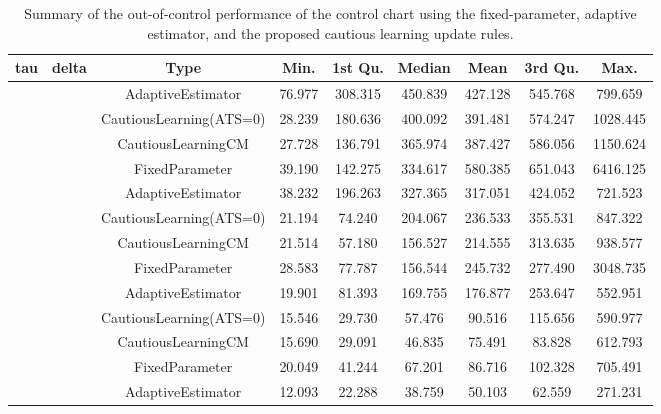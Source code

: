 \begin{table}[!h]

\caption{Summary of the out-of-control performance of the control chart using the fixed-parameter, adaptive estimator, and the proposed cautious learning update rules.}
\centering
\begin{tabular}[t]{ccccccccc}
\toprule
tau & delta & Type & Min. & 1st Qu. & Median & Mean & 3rd Qu. & Max.\\
\midrule
 &  & AdaptiveEstimator & 76.977 & 308.315 & 450.839 & 427.128 & 545.768 & 799.659\\

 &  & CautiousLearning(ATS=0) & 28.239 & 180.636 & 400.092 & 391.481 & 574.247 & 1028.445\\

 &  & CautiousLearningCM & 27.728 & 136.791 & 365.974 & 387.427 & 586.056 & 1150.624\\

 & \multirow[t]{-4}{*}{\centering\arraybackslash 0.25} & FixedParameter & 39.190 & 142.275 & 334.617 & 580.385 & 651.043 & 6416.125\\
\cmidrule{2-9}
 &  & AdaptiveEstimator & 38.232 & 196.263 & 327.365 & 317.051 & 424.052 & 721.523\\

 &  & CautiousLearning(ATS=0) & 21.194 & 74.240 & 204.067 & 236.533 & 355.531 & 847.322\\

 &  & CautiousLearningCM & 21.514 & 57.180 & 156.527 & 214.555 & 313.635 & 938.577\\

 & \multirow[t]{-4}{*}{\centering\arraybackslash 0.35} & FixedParameter & 28.583 & 77.787 & 156.544 & 245.732 & 277.490 & 3048.735\\
\cmidrule{2-9}
 &  & AdaptiveEstimator & 19.901 & 81.393 & 169.755 & 176.877 & 253.647 & 552.951\\

 &  & CautiousLearning(ATS=0) & 15.546 & 29.730 & 57.476 & 90.516 & 115.656 & 590.977\\

 &  & CautiousLearningCM & 15.690 & 29.091 & 46.835 & 75.491 & 83.828 & 612.793\\

 & \multirow[t]{-4}{*}{\centering\arraybackslash 0.50} & FixedParameter & 20.049 & 41.244 & 67.201 & 86.716 & 102.328 & 705.491\\
\cmidrule{2-9}
 &  & AdaptiveEstimator & 12.093 & 22.288 & 38.759 & 50.103 & 62.559 & 271.231\\


\end{tabular}
\end{table}
